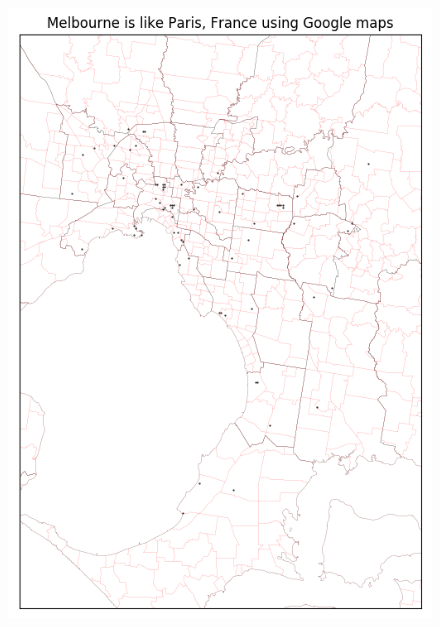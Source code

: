\documentclass[sageh,times]{sagej}
\begin{document}
\begin{figure}[!htbp]
\centering    
\includegraphics[scale=0.40]{Images/Melbourne_Paris,France-GM.png} 

\end{figure}
\end{document}
